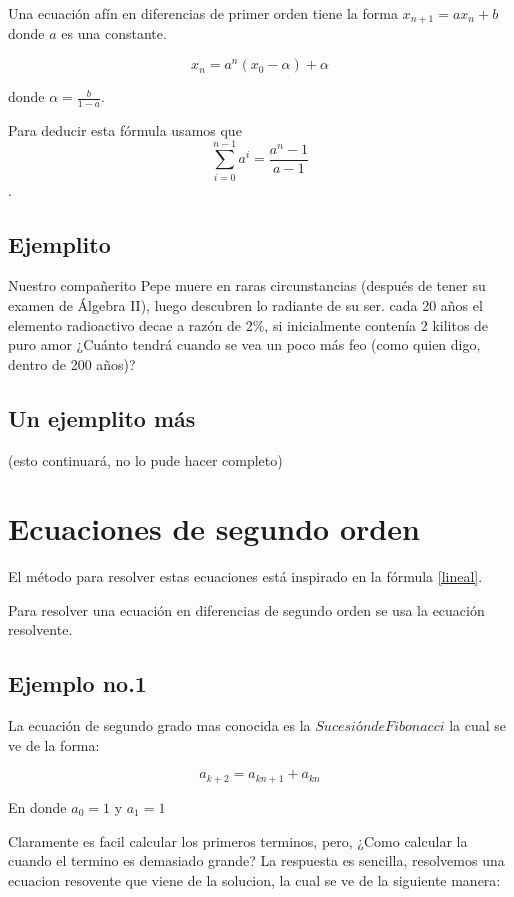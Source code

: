 \documentclass{article}
\begin{document}
Una ecuación afín en diferencias de primer orden tiene la forma $x_{n+1}=ax_n+b$ donde $a$ es una constante. 

\begin{equation}
  \label{afin}
  x_n=a^n(x_0-\alpha)+\alpha
\end{equation}

donde $\alpha=\frac{b}{1-a}$. 

Para deducir esta fórmula usamos que $$\sum_{i=0}^{n-1}a^i=\frac{a^n-1}{a-1}$$.

\subsection{Ejemplito}

Nuestro compañerito Pepe muere en raras circunstancias (después de tener su examen de Álgebra II), luego descubren lo radiante de su ser. cada 20 años el elemento radioactivo decae a razón de $2\%$, si inicialmente contenía 2 kilitos de puro amor ¿Cuánto tendrá cuando se vea un poco más feo (como quien digo, dentro de 200 años)?

\subsection{Un ejemplito más}

(esto continuará, no lo pude hacer completo)

\section{Ecuaciones de segundo orden}

El método para resolver estas ecuaciones está inspirado en la fórmula \ref{lineal}.

Para resolver una ecuación en diferencias de segundo orden se usa la ecuación resolvente.

\subsection{Ejemplo no.1}

La ecuación de segundo grado mas conocida es la $Sucesión de Fibonacci$ la cual se ve de la forma:

$$a_{k+2}=a_{kn+1}+a_{kn}$$
 
En donde $a_{0}=1$ y $a_{1}=1$

Claramente es facil calcular los primeros terminos, pero, ¿Como calcular la cuando el termino es demasiado grande?
La respuesta es sencilla, resolvemos una ecuacion resovente que viene de la solucion, la cual se ve de la siguiente manera:
\end{document}
